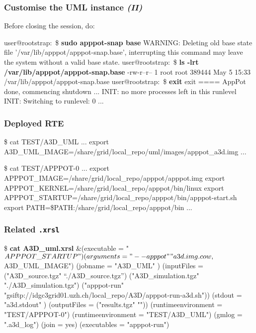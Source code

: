 \documentclass{beamer}
\begin{document}
\begin{frame}[fragile]
  \frametitle{Customise the UML instance \emph{(II)}}
Before closing the session, do:
\begin{semiverbatim}
user@rootstrap:~\$ \textbf{sudo apppot-snap base}
WARNING: Deleting old base state file '/var/lib/apppot/apppot-snap.base', interrupting this command may leave the system without a valid base state.
user@rootstrap:~\$ \textbf{ls -lrt /var/lib/apppot/apppot-snap.base}
-rw-r--r-- 1 root root 389444 May  5 15:33 /var/lib/apppot/apppot-snap.base
user@rootstrap:~\$ \textbf{exit}
exit
==== AppPot done, commencing shutdown ...
INIT: no more processes left in this runlevel
INIT: Switching to runlevel: 0
...
\end{semiverbatim}
\end{frame}

\begin{frame}[fragile]
  \frametitle{Deployed RTE}
\begin{semiverbatim}\footnotesize
\$ cat TEST/A3D\_UML
...
export A3D\_UML\_IMAGE=/share/grid/local\_repo/uml/images/apppot\_a3d.img
...
\end{semiverbatim}

\begin{semiverbatim}\footnotesize
\$ cat TEST/APPPOT-0
...
export APPPOT\_IMAGE=/share/grid/local\_repo/apppot/apppot.img
export APPPOT\_KERNEL=/share/grid/local\_repo/apppot/bin/linux
export APPPOT\_STARTUP=/share/grid/local\_repo/apppot/bin/apppot-start.sh
export PATH=\$PATH:/share/grid/local\_repo/apppot/bin
...
\end{semiverbatim}
\end{frame}

\begin{frame}[fragile]
  \frametitle{Related \texttt{.xrsl}}
\begin{semiverbatim}\small
\$ \textbf{cat A3D\_uml.xrsl}
&(executable = "$APPPOT\_STARTUP" )
(arguments = "--apppot" "a3d.img.cow,$A3D\_UML\_IMAGE")
(jobname = "A3D\_UML" )
(inputFiles = 
  ("A3D\_source.tgz" “./A3D\_source.tgz”) 
  ("A3D\_simulation.tgz" "./A3D\_simulation.tgz") 
  ("apppot-run" 
   "gsiftp://idgc3grid01.uzh.ch/local\_repo/A3D/apppot-run-a3d.sh"))
(stdout = "a3d.stdout" )
(outputFiles = ("results.tgz" ""))
(runtimeenvironment = "TEST/APPPOT-0")
(runtimeenvironment = "TEST/A3D\_UML")
(gmlog = ".a3d\_log")
(join = yes)
(executables = "apppot-run")
\end{semiverbatim}
\end{frame}
\end{document}
